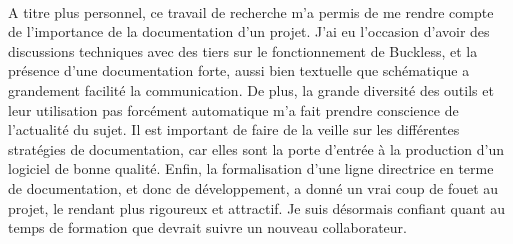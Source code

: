 \paragraph{}
    A titre plus personnel, ce travail de recherche m'a permis de me rendre compte de l'importance
    de la documentation d'un projet. J'ai eu l'occasion d'avoir des discussions techniques avec
    des tiers sur le fonctionnement de Buckless, et la présence d'une documentation forte,
    aussi bien textuelle que schématique a grandement facilité la communication. De plus, la grande
    diversité des outils et leur utilisation pas forcément automatique m'a fait prendre conscience
    de l'actualité du sujet. Il est important de faire de la veille sur les différentes stratégies de
    documentation, car elles sont la porte d'entrée à la production d'un logiciel de bonne qualité.
    Enfin, la formalisation d'une ligne directrice en terme de documentation, et donc de développement,
    a donné un vrai coup de fouet au projet, le rendant plus rigoureux et attractif. Je suis désormais
    confiant quant au temps de formation que devrait suivre un nouveau collaborateur.